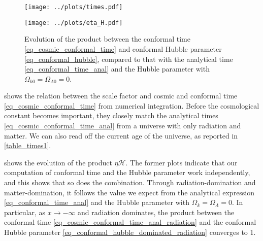 \documentclass[10pt,a4paper]{article}
\begin{document}
\begin{figure}
	\centering
	\texttt{[image: ../plots/times.pdf]}
	\caption{%
		Evolution of numerically integrated cosmic and conformal times \eqref{eq_cosmic_conformal_time} in the Planck 2018 cosmology \eqref{eq_planck2018},
		compared to the analytical expressions \eqref{eq_cosmic_conformal_time_anal} in a universe with no cosmological constant.
	}
	\label{fig_cosmic_conformal_time}

	\bigskip

	\texttt{[image: ../plots/eta\_H.pdf]}
	\caption{%
		Evolution of the product between the conformal time \eqref{eq_cosmic_conformal_time} and conformal Hubble parameter \eqref{eq_conformal_hubble},
		compared to that with the analytical time \eqref{eq_conformal_time_anal} and the Hubble parameter with $\Omega_{k0}=\Omega_{\Lambda0}=0$.
	}
	\label{fig_eta_H}
\end{figure}

 shows the relation between the scale factor and cosmic and conformal time \eqref{eq_cosmic_conformal_time} from numerical integration.
Before the cosmological constant becomes important, they closely match the analytical times \eqref{eq_cosmic_conformal_time_anal} from a universe with only radiation and matter.
We can also read off the current age of the universe, as reported in \cref{table_times1}.

 shows the evolution of the product $\eta \mathcal{H}$.
The former plots indicate that our computation of conformal time and the Hubble parameter work independently,
and this shows that so does the combination.
Through radiation-domination and matter-domination,
it follows the value we expect from the analytical expression \eqref{eq_conformal_time_anal}
and the Hubble parameter with $\Omega_{k} = \Omega_\Lambda = 0$.
In particular, as $x \rightarrow -\infty$ and radiation dominates,
the product between the conformal time \eqref{eq_cosmic_conformal_time_anal_radiation}
and the conformal Hubble parameter \eqref{eq_conformal_hubble_dominated_radiation} converges to 1.
\end{document}
